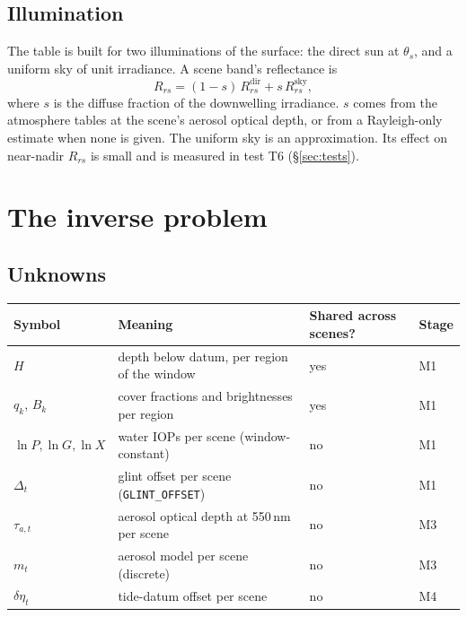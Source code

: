 \documentclass[11pt]{article}
\numberwithin{equation}{section}
\newcommand{\code}[1]{\texttt{#1}}
\begin{document}
\subsection{Illumination}

The table is built for two illuminations of the surface: the direct sun at $\theta_s$, and a
uniform sky of unit irradiance. A scene band's reflectance is
\begin{equation}\label{eq:illum}
R_{rs} = (1-s)\,R_{rs}^{\mathrm{dir}} + s\,R_{rs}^{\mathrm{sky}},
\end{equation}
where $s$ is the diffuse fraction of the downwelling irradiance. $s$ comes from the atmosphere
tables at the scene's aerosol optical depth, or from a Rayleigh-only estimate when none is
given. The uniform sky is an approximation. Its effect on near-nadir $R_{rs}$ is small and is
measured in test T6 (\S\ref{sec:tests}).

\section{The inverse problem}\label{sec:inverse}

\subsection{Unknowns}

\begin{center}
\begin{tabular}{@{}llll@{}}
\toprule
Symbol & Meaning & Shared across scenes? & Stage\\
\midrule
$H$ & depth below datum, per region of the window & yes & M1\\
$q_k$, $B_k$ & cover fractions and brightnesses per region & yes & M1\\
$\ln P, \ln G, \ln X$ & water IOPs per scene (window-constant) & no & M1\\
$\Delta_t$ & glint offset per scene (\code{GLINT\_OFFSET}) & no & M1\\
$\tau_{a,t}$ & aerosol optical depth at 550\,nm per scene & no & M3\\
$m_t$ & aerosol model per scene (discrete) & no & M3\\
$\delta\eta_t$ & tide-datum offset per scene & no & M4\\
\bottomrule
\end{tabular}
\end{center}
\end{document}
